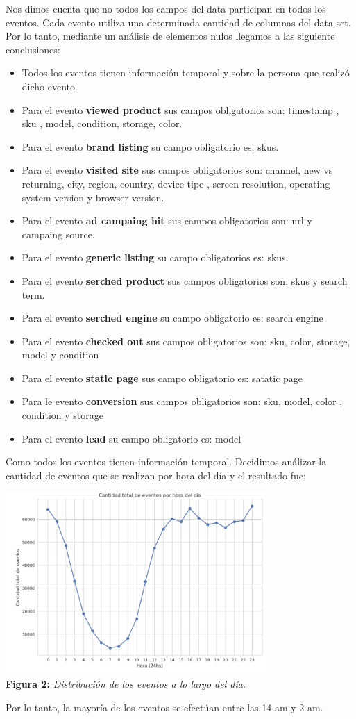 \documentclass[titlepage,a4paper]{article}
\begin{document}
	Nos dimos cuenta que no todos los campos del data participan en todos los eventos. Cada evento utiliza una determinada cantidad de columnas del data set. Por lo tanto, mediante un análisis de elementos nulos llegamos a las siguiente conclusiones:
	\begin{itemize}
		\item Todos los eventos tienen información temporal y sobre la persona que realizó dicho evento. 
		\item Para el evento \textbf{viewed product} sus campos obligatorios son: timestamp , sku , model, condition, storage, color.
		\item Para el evento \textbf{brand listing} su campo obligatorio es: skus. 
		\item Para el evento \textbf{visited site} sus campos obligatorios son: channel, new vs returning, city, region, country, device tipe , screen resolution, operating system version y browser version.
		\item Para el evento \textbf{ad campaing hit} sus campos obligatorios son: url  y campaing source.
		\item Para el evento \textbf{generic listing} su campo obligatorios es: skus.
		\item Para el evento  \textbf{serched product } sus campos obligatorios son: skus y search term.
		\item Para el evento \textbf{serched engine} su campo obligatorio es: search engine
		\item Para el evento \textbf{checked out}  sus campos obligatorios son: sku, color, storage, model y condition 
		\item Para el evento \textbf{static page}  sus campo obligatorio es: satatic page
		\item Para le evento \textbf{conversion} sus campos obligatorios son:  sku, model, color , condition y storage
		\item Para el evento \textbf{lead} su campo obligatorio es: model
	\end{itemize}	
	Como todos los eventos tienen información temporal. Decidimos análizar la cantidad de eventos que se realizan por hora del día y el resultado fue:
	\begin{center}
	\includegraphics[width=10cm]{cantidadDeEventosPorHoraDelDia.jpg}\\
	\textbf{Figura 2:}  \textit{Distribución de los eventos a lo largo del día.}
	\end{center}
	Por lo tanto, la mayoría de los eventos se efectúan entre las 14 am y 2 am. \\
\end{document}
